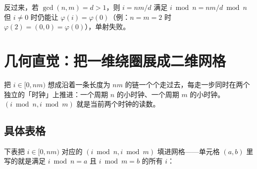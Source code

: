 \documentclass{article}
\begin{document}
反过来，若 $\gcd(n, m) = d > 1$，则 $i = nm / d$ 满足 $i \bmod n = nm/d \bmod n$ 但 $i \ne 0$ 时仍能让 $\varphi(i) = \varphi(0)$（例：$n = m = 2$ 时 $\varphi(2) = (0, 0) = \varphi(0)$），单射失败。

\section{几何直觉：把一维绕圈展成二维网格}

把 $i \in [0, nm)$ 想成沿着一条长度为 $nm$ 的链一个个走过去，每走一步同时在两个独立的「时钟」上推进：一个周期 $n$ 的小时钟、一个周期 $m$ 的小时钟。$(i \bmod n, i \bmod m)$ 就是当前两个时钟的读数。

\subsection*{具体表格}

下表把 $i \in [0, nm)$ 对应的 $(i \bmod n, i \bmod m)$ 填进网格——单元格 $(a, b)$ 里写的就是满足 $i \bmod n = a$ 且 $i \bmod m = b$ 的所有 $i$：
\end{document}
